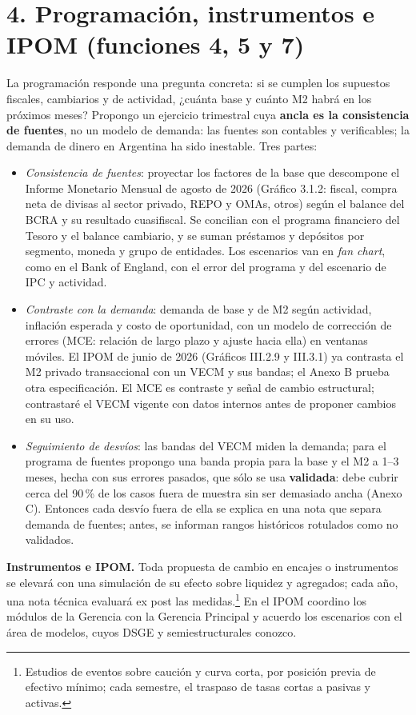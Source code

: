 \documentclass[11pt,a4paper]{article}
\begin{document}
\section*{4. Programación, instrumentos e IPOM (funciones 4, 5 y 7)}
La programación responde una pregunta concreta: si se cumplen los supuestos fiscales, cambiarios y de actividad, ¿cuánta base y cuánto M2 habrá en los próximos meses? Propongo un ejercicio trimestral cuya \textbf{ancla es la consistencia de fuentes}, no un modelo de demanda: las fuentes son contables y verificables; la demanda de dinero en Argentina ha sido inestable. Tres partes:
\begin{itemize}
\item \emph{Consistencia de fuentes}: proyectar los factores de la base que descompone el Informe Monetario Mensual de agosto de 2026 (Gráfico 3.1.2: fiscal, compra neta de divisas al sector privado, REPO y OMAs, otros) según el balance del BCRA y su resultado cuasifiscal. Se concilian con el programa financiero del Tesoro y el balance cambiario, y se suman préstamos y depósitos por segmento, moneda y grupo de entidades. Los escenarios van en \emph{fan chart}, como en el Bank of England, con el error del programa y del escenario de IPC y actividad.
\item \emph{Contraste con la demanda}: demanda de base y de M2 según actividad, inflación esperada y costo de oportunidad, con un modelo de corrección de errores (MCE: relación de largo plazo y ajuste hacia ella) en ventanas móviles. El IPOM de junio de 2026 (Gráficos III.2.9 y III.3.1) ya contrasta el M2 privado transaccional con un VECM y sus bandas; el Anexo B prueba otra especificación. El MCE es contraste y señal de cambio estructural; contrastaré el VECM vigente con datos internos antes de proponer cambios en su uso.
\item \emph{Seguimiento de desvíos}: las bandas del VECM miden la demanda; para el programa de fuentes propongo una banda propia para la base y el M2 a 1--3 meses, hecha con sus errores pasados, que sólo se usa \textbf{validada}: debe cubrir cerca del 90\,\% de los casos fuera de muestra sin ser demasiado ancha (Anexo C). Entonces cada desvío fuera de ella se explica en una nota que separa demanda de fuentes; antes, se informan rangos históricos rotulados como no validados.
\end{itemize}
\textbf{Instrumentos e IPOM.} Toda propuesta de cambio en encajes o instrumentos se elevará con una simulación de su efecto sobre liquidez y agregados; cada año, una nota técnica evaluará ex post las medidas.\footnote{Estudios de eventos sobre caución y curva corta, por posición previa de efectivo mínimo; cada semestre, el traspaso de tasas cortas a pasivas y activas.} En el IPOM coordino los módulos de la Gerencia con la Gerencia Principal y acuerdo los escenarios con el área de modelos, cuyos DSGE y semiestructurales conozco.
\end{document}
